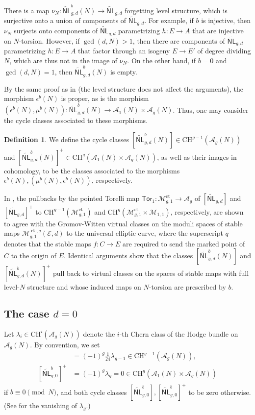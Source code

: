 \documentclass[12pt]{amsart}
\def\cA{\mathcal{A}}
\def\cE{\mathcal{E}}
\def\cM{\mathcal{M}}
\DeclareMathOperator{\ct}{ct}
\newcommand{\CH}{\mathrm{CH}}
\newcommand{\wNL}{{\widetilde{\mathsf{NL}}}}
\newcommand{\Tor}{{\mathsf{Tor}}}
\theoremstyle{definition}
\newtheorem{defn}[thm]{Definition}
\begin{document}
There is a map $\nu_N:\wNL^b_{g,d}(N)\to \wNL_{g,d}$ forgetting level structure, which is surjective onto a union of components of $\wNL_{g,d}$. For example, if $b$ is injective, then $\nu_N$ surjects onto components of $\wNL_{g,d}$ parametrizing $h:E\to A$ that are injective on $N$-torsion. However, if $\gcd(d,N)>1$, then there are components of $\wNL_{g,d}$ parametrizing $h:E\to A$ that factor through an isogeny $E\to E'$ of degree dividing $N$, which are thus not in the image of $\nu_N$. On the other hand, if $b=0$ and $\gcd(d,N)=1$, then $\wNL^b_{g,d}(N)$ is empty.

By the same proof as in \cite[Lemma 3.4]{gl} (the level structure does not affect the arguments), the morphism $\epsilon^b(N)$ is proper, as is the morphism $(\epsilon^b(N),\mu^b(N)):\wNL^b_{g,d}(N)\to \cA_1(N)\times \cA_g(N)$. Thus, one may consider the cycle classes associated to these morphisms.

\begin{defn}
    We define the cycle classes $[\wNL^b_{g,d}(N)]\in \CH^{g-1}(\cA_g(N))$ and $[\wNL^b_{g,d}(N)]^+\in \CH^g(\cA_1(N)\times\cA_g(N))$, as well as their images in cohomology, to be the classes associated to the morphisms $\epsilon^b(N),(\mu^b(N),\epsilon^b(N))$, respectively.
\end{defn}

In \cite{gl}, the pullbacks by the pointed Torelli map $\Tor_1:\cM^{\ct}_{g,1}\to\cA_g$ of $[\wNL_{g,d}]$ and $[\wNL_{g,d}]^+$ to $\CH^{g-1}(\cM_{g,1}^{\ct})$ and $\CH^{g}(\cM^{\ct}_{g,1}\times\cM_{1,1})$, respectively, are shown to agree with the Gromov-Witten virtual classes on the moduli spaces of stable maps $\cM_{g,1}^{\ct,q}(\cE,d)$ to the universal elliptic curve, where the superscript $q$ denotes that the stable maps $f:C\to E$ are required to send the marked point of $C$ to the origin of $E$. Identical arguments show that the classes $[\wNL^b_{g,d}(N)]$ and  $[\wNL^b_{g,d}(N)]^+$ pull back to virtual classes on the spaces of stable maps with full level-$N$ structure and whose induced maps on $N$-torsion are prescribed by $b$.

\subsection{The case $d=0$}\label{d=0_sec}

Let $\lambda_i\in \CH^i(\cA_g(N))$ denote the $i$-th Chern class of the Hodge bundle on $\cA_g(N)$. By convention, we set
\begin{align*}
    [\wNL^b_{g,0}]&=(-1)^{g}\frac{1}{24}\lambda_{g-1}\in \CH^{g-1}(\cA_g(N)),\\
    [\wNL^b_{g,0}]^+&=(-1)^g\lambda_g=0\in \CH^g(\cA_1(N)\times\cA_g(N))
\end{align*}
 if $b\equiv0\pmod{N}$, and both cycle classes $[\wNL^b_{g,0}],[\wNL^b_{g,0}]^+$ to be zero otherwise. (See \cite[Proposition 1.2]{vandergeer} for the vanishing of $\lambda_g$.)
 
\end{document}
